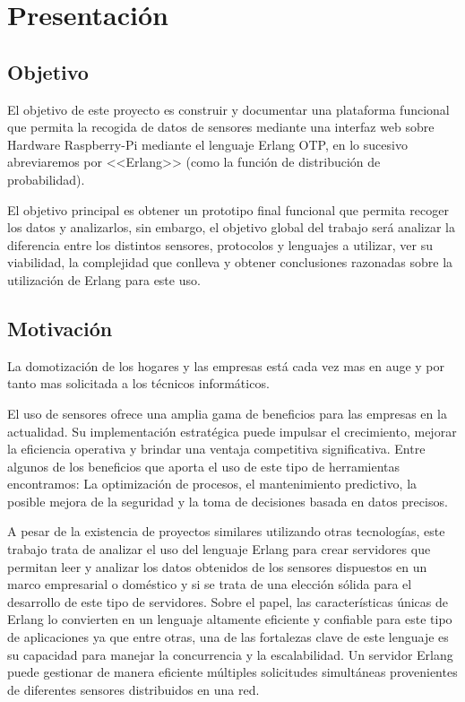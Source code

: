 
\chapter{Presentación}\label{cap.introduccion}

\section{Objetivo}%
\label{sec:Objetivo}

El objetivo de este proyecto es construir y documentar una plataforma funcional que permita la recogida de datos de sensores mediante una interfaz web sobre Hardware Raspberry-Pi mediante el lenguaje Erlang OTP, en lo sucesivo abreviaremos por <<Erlang>> (como la función de distribución de probabilidad).

El objetivo principal es obtener un prototipo final funcional que permita recoger los datos y analizarlos, sin embargo, el objetivo global del trabajo será analizar la diferencia entre los distintos sensores, protocolos y lenguajes a utilizar, ver su viabilidad, la complejidad que conlleva y obtener conclusiones razonadas sobre la utilización de Erlang para este uso.


\section{Motivación}

La domotización de los hogares y las empresas está cada vez mas en auge y por tanto mas solicitada a los técnicos informáticos.

El uso de sensores ofrece una amplia gama de beneficios para las empresas en la actualidad. Su implementación estratégica puede impulsar el crecimiento, mejorar la eficiencia operativa y brindar una ventaja competitiva significativa. Entre algunos de los beneficios que aporta el uso de este tipo de herramientas encontramos: La optimización de procesos, el mantenimiento predictivo, la posible mejora de la seguridad y la toma de decisiones basada en datos precisos.

A pesar de la existencia de proyectos similares utilizando otras tecnologías, este trabajo trata de analizar el uso del lenguaje Erlang para crear servidores que permitan leer y analizar los datos obtenidos de los sensores dispuestos en un marco empresarial o doméstico y si se trata de una elección sólida para el desarrollo de este tipo de servidores. Sobre el papel, las características únicas de Erlang lo convierten en un lenguaje altamente eficiente y confiable para este tipo de aplicaciones ya que entre otras, una de las fortalezas clave de este lenguaje es su capacidad para manejar la concurrencia y la escalabilidad. Un servidor Erlang puede gestionar de manera eficiente múltiples solicitudes simultáneas provenientes de diferentes sensores distribuidos en una red.

